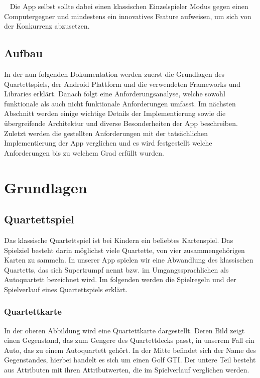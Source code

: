 \documentclass{scrartcl}
\begin{document}
\ \newline
Die App selbst sollte dabei einen klassischen Einzelspieler Modus gegen einen
Computergegner und mindestens ein innovatives Feature aufweisen, um sich von der
Konkurrenz abzusetzen.

\subsection{Aufbau}

In der nun folgenden Dokumentation werden zuerst die Grundlagen des
Quartettspiels, der Android Plattform und die verwendeten Frameworks und
Libraries erklärt. Danach folgt eine Anforderungsanalyse, welche sowohl
funktionale als auch nicht funktionale Anforderungen umfasst. Im nächsten
Abschnitt werden einige wichtige Details der Implementierung sowie die
übergreifende Architektur und diverse Besonderheiten der App beschreiben.
Zuletzt werden die gestellten Anforderungen mit der tatsächlichen
Implementierung der App verglichen und es wird festgestellt welche Anforderungen
bis zu welchem Grad erfüllt wurden.

\section{Grundlagen}
\subsection{Quartettspiel}

Das klassische Quartettspiel ist bei Kindern ein beliebtes Kartenspiel. Das
Spielziel besteht darin möglichst viele Quartette, von vier zusammengehörigen
Karten zu sammeln. In unserer App spielen wir eine Abwandlung des klassischen
Quartetts, das sich Supertrumpf nennt bzw. im Umgangssprachlichen als
Autoquartett  bezeichnet wird. Im folgenden werden die Spielregeln und der
Spielverlauf eines Quartettspiels erklärt.

\subsubsection{Quartettkarte}

In der oberen Abbildung wird eine Quartettkarte dargestellt. Deren Bild zeigt
einen Gegenstand, das zum Gengere des Quartettdecks passt, in unserem Fall ein
Auto, das zu einem Autoquartett gehört. In der Mitte befindet sich der Name des
Gegenstandes, hierbei handelt es sich um einen Golf GTI. Der untere Teil besteht
aus Attributen mit ihren Attributwerten, die im Spielverlauf verglichen werden.
\end{document}
